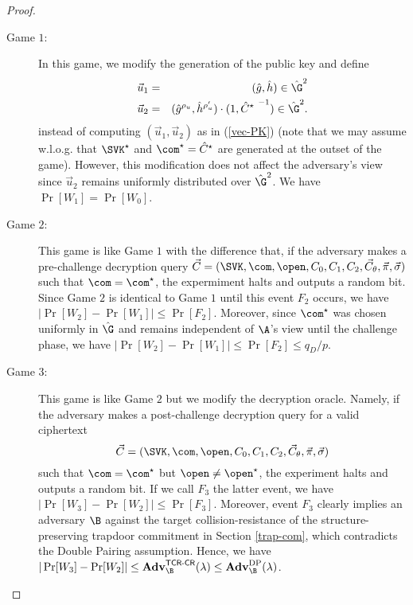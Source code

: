 \begin{proof}
\begin{description}
  \item[\textsf{Game} $1$:] In this game, we modify the generation of the public key and define
    \begin{eqnarray} \label{vec-PK-sim} 
      \vec{u}_1 &=& (\hat{g}, \hat{h}) \in \hat{\G}^2  \\ \nonumber 
      \vec{u}_2 &=&  (\hat{g}^{\rho_u}, \hat{h}^{\rho_u'}) \cdot (1,{\hat{C}^\star ~}^{-1})  \in \hat{\G}^2.
    \end{eqnarray}
    instead of computing $(\vec{u}_1,\vec{u}_2)$ as in (\ref{vec-PK}) (note that we may assume w.l.o.g. that $\SVK^\star$ and $\com^\star=\hat{C}^\star$ are 
    generated 
    at the outset of the game).  However, this modification does not affect the adversary's view since $\vec{u}_2$ remains uniformly distributed 
    over $\hat{\G}^2$. We have $\Pr[W_1]=\Pr[W_0]$.   \smallskip \smallskip 

  \item[\textsf{Game} $2$:] This game is like Game $1$ with the difference that, if the adversary makes a pre-challenge decryption query 
    $ \vec{C} = (\SVK, \com, \open, C_0, C_1, C_2, \vec{C}_{\theta}, \vec{\pi}, \vec{\sigma})  $ such that $\com=\com^\star$, the expermiment halts and 
    outputs a random bit. Since Game $2$ is identical to Game $1$ until this event $F_2$ occurs, we have 
    $|\Pr[W_2]-\Pr[W_1]| \leq \Pr[F_2]$. Moreover, since $\com^\star$ was chosen uniformly in $\hat{\G}$ and remains independent of $\A$'s view until 
    the challenge phase, we have $ |\Pr[W_2]-\Pr[W_1]| \leq \Pr[F_2] \leq q_D/p$. \smallskip \smallskip 


  \item[\textsf{Game} $3$:] This game is like Game $2$ but we modify the decryption oracle. Namely, if the adversary makes a post-challenge decryption query 
    for a valid ciphertext
    $$ \vec{C} = (\SVK, \com, \open, C_0, C_1, C_2, \vec{C}_{\theta}, \vec{\pi}, \vec{\sigma})  $$
    such that $\com=\com^\star$ but $\open \neq \open^\star$, the experiment halts and outputs a random bit. If we call $F_3$ the latter event, 
    we have $|\Pr[W_3]-\Pr[W_2]| \leq \Pr[F_3]$. Moreover, event $F_3$ clearly implies an adversary $\B$ against the target collision-resistance of the 
    structure-preserving trapdoor commitment in Section \ref{trap-com}, which contradicts the Double Pairing assumption. Hence, we have  
    $|\Pr[W_3]-\Pr[W_2]| \leq \mathbf{Adv}_\B^{\mathsf{TCR}\textsf{-}\mathsf{CR}}(\lambda) \leq   \mathbf{Adv}_\B^{\mathrm{DP}}(\lambda)$.   \smallskip \smallskip 



\end{description}
\end{proof}
